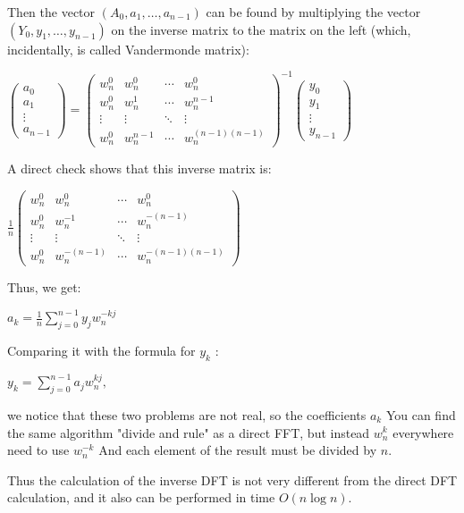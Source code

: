 Then the vector $(A_0, a_1, \ldots, a_ {n-1})$ can be found by multiplying the vector $(Y_0, y_1, \ldots, y_ {n-1})$ on the inverse matrix to the matrix on the left (which, incidentally, is called Vandermonde matrix):

$\begin{pmatrix}a_{0}\\
a_{1}\\
\vdots\\
a_{n-1}
\end{pmatrix}=\begin{pmatrix}w_{n}^{0} & w_{n}^{0} & \cdots & w_{n}^{0}\\
w_{n}^{0} & w_{n}^{1} & \cdots & w_{n}^{n-1}\\
\vdots & \vdots & \ddots & \vdots\\
w_{n}^{0} & w_{n}^{n-1} & \cdots & w_{n}^{(n-1)(n-1)}
\end{pmatrix}^{-1}\begin{pmatrix}y_{0}\\
y_{1}\\
\vdots\\
y_{n-1}
\end{pmatrix}$

A direct check shows that this inverse matrix is:

$\frac{1}{n}\begin{pmatrix}w_{n}^{0} & w_{n}^{0} & \cdots & w_{n}^{0}\\
w_{n}^{0} & w_{n}^{-1} & \cdots & w_{n}^{-(n-1)}\\
\vdots & \vdots & \ddots & \vdots\\
w_{n}^{0} & w_{n}^{-(n-1)} & \cdots & w_{n}^{-(n-1)(n-1)}
\end{pmatrix}$

Thus, we get:

$a_{k}=\frac{1}{n}\sum_{j=0}^{n-1}y_{j}w_{n}^{-kj}$

Comparing it with the formula for $y_k$ :

$y_k = \sum_ {j = 0} ^ {n-1} a_j w_n ^ {kj},$

we notice that these two problems are not real, so the coefficients $a_k$ You can find the same algorithm "divide and rule" as a direct FFT, but instead $w_n ^ k$ everywhere need to use $w_n ^ {-k}$ And each element of the result must be divided by $n$.

Thus the calculation of the inverse DFT is not very different from the direct DFT calculation, and it also can be performed in time $O (n \log n)$.

